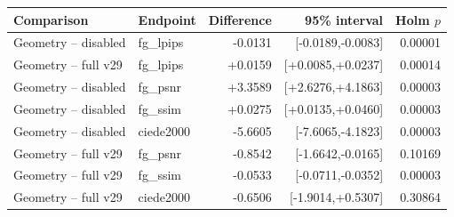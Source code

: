 \begin{tabular}{llrrr}
\toprule
Comparison & Endpoint & Difference & 95\% interval & Holm $p$ \\
\midrule
Geometry -- disabled & fg\_lpips & -0.0131 & [-0.0189,-0.0083] & 0.00001 \\
Geometry -- full v29 & fg\_lpips & +0.0159 & [+0.0085,+0.0237] & 0.00014 \\
Geometry -- disabled & fg\_psnr & +3.3589 & [+2.6276,+4.1863] & 0.00003 \\
Geometry -- disabled & fg\_ssim & +0.0275 & [+0.0135,+0.0460] & 0.00003 \\
Geometry -- disabled & ciede2000 & -5.6605 & [-7.6065,-4.1823] & 0.00003 \\
Geometry -- full v29 & fg\_psnr & -0.8542 & [-1.6642,-0.0165] & 0.10169 \\
Geometry -- full v29 & fg\_ssim & -0.0533 & [-0.0711,-0.0352] & 0.00003 \\
Geometry -- full v29 & ciede2000 & -0.6506 & [-1.9014,+0.5307] & 0.30864 \\
\bottomrule
\end{tabular}
